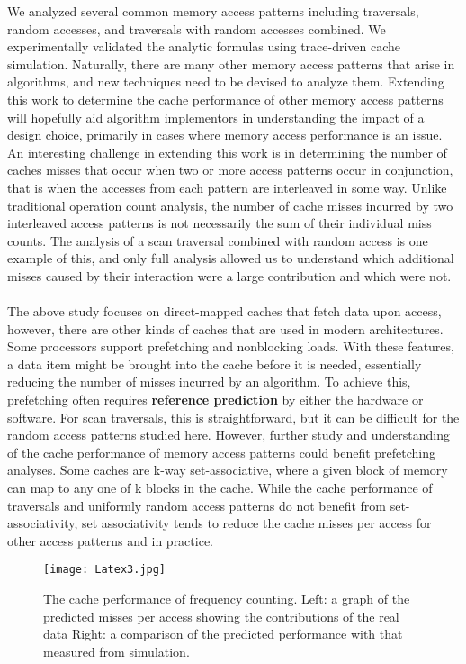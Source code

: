 \documentclass[14pt]{article}
\begin{document}
We analyzed several common memory access patterns including traversals, random accesses, and traversals with random accesses combined. We experimentally validated the analytic formulas using trace-driven cache simulation. Naturally, there are many other memory access patterns that arise in algorithms, and new techniques need to be devised to analyze them. Extending this work to determine the cache performance of other memory access patterns will hopefully aid algorithm implementors in understanding the impact of a design choice, primarily in cases where memory access performance is an issue. An interesting challenge in extending this work is in determining the number of caches misses that occur when two or more access patterns occur in conjunction, that is when the accesses from each pattern are interleaved in some way. Unlike traditional operation count analysis, the number of cache misses incurred by two interleaved access patterns is not necessarily the sum of their individual miss counts. The analysis of a scan traversal combined with random access is one example of this, and only full analysis allowed us to understand which additional misses caused by their interaction were a large contribution and which were not. 
\\\\
The above study focuses on direct-mapped caches that fetch data upon access, however, there are other kinds of caches that are used in modern architectures. Some processors support prefetching and nonblocking loads. With these features, a data item might be brought into the cache before it is needed, essentially reducing the number of misses incurred by an algorithm. To achieve this, prefetching often requires \textbf{reference prediction} by either the hardware or software. For scan traversals, this is straightforward, but it can be difficult for the random access patterns studied here. However, further study and understanding of the cache performance of memory access patterns could benefit prefetching analyses. Some caches are k-way set-associative, where a given block of memory can map to any one of k blocks in the cache. While the cache performance of traversals and uniformly random access patterns do not benefit from set-associativity, set associativity tends to reduce the cache misses per access for other access patterns and in practice.
\begin{figure}[H]
\centering
\texttt{[image: Latex3.jpg]}
\caption{ The cache performance of frequency counting. Left: a graph of the predicted misses per access showing the contributions of the real data Right: a comparison of the predicted performance with that
measured from simulation. 
 }\label{visina8}
\end{figure}
\end{document}
